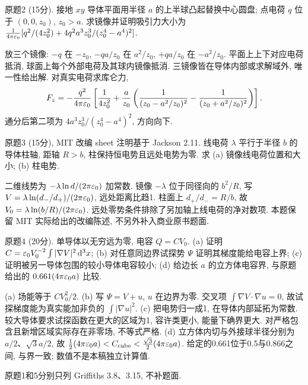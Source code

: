 \begin{exercise}
原题2 (15分). 接地 $xy$ 导体平面用半径 $a$ 的上半球凸起替换中心圆盘; 点电荷 $q$ 位于 $(0,0,z_0)$, $z_0>a$. 求镜像并证明吸引力大小为
$\frac1{4\pi\varepsilon_0}[q^2/(4z_0^2)+4q^2a^3z_0^3/(z_0^4-a^4)^2]$.
\end{exercise}
\begin{solution}
放三个镜像: $-q$ 在 $-z_0$, $-qa/z_0$ 在 $a^2/z_0$, $+qa/z_0$ 在 $-a^2/z_0$. 平面上上下对应电荷抵消, 球面上每个外部电荷及其球内镜像抵消. 三镜像皆在导体内部或求解域外, 唯一性给出解. 对真实电荷求库仑力,
\[
F_z=-\frac{q^2}{4\pi\varepsilon_0}\left[\frac1{4z_0^2}
+\frac a{z_0}\left(\frac1{(z_0-a^2/z_0)^2}-\frac1{(z_0+a^2/z_0)^2}\right)\right].
\]
通分后第二项为 $4a^3z_0^3/(z_0^4-a^4)^2$, 方向向下.
\end{solution}
\begin{exercise}
原题3 (15分), MIT 改编 sheet 注明基于 Jackson 2.11. 线电荷 $\lambda$ 平行于半径 $b$ 的导体柱轴, 距轴 $R>b$, 柱保持恒电势且远处电势为零. 求 (a) 镜像线电荷位置和大小; (b) 柱电势.
\end{exercise}
\begin{solution}
二维线势为 $-\lambda\ln d/(2\pi\varepsilon_0)$ 加常数. 镜像 $-\lambda$ 位于同径向的 $b^2/R$, 写 $V=\lambda\ln(d_-/d_+)/(2\pi\varepsilon_0)$, 远处距离比趋1. 柱面上 $d_+/d_-=R/b$, 故 $V_0=\lambda\ln(b/R)/(2\pi\varepsilon_0)$. 远处零势条件排除了另加轴上线电荷的净对数项. 本题保留 MIT 实际给出的改编陈述, 不另外补入商业原书题面.
\end{solution}
\begin{exercise}
原题4 (20分). 单导体以无穷远为零, 电容 $Q=CV_0$. (a) 证明 $C=\varepsilon_0 V_0^{-2}\int|\nabla V|^2\,\mathrm d^3x$; (b) 对任意同边界试探势 $\Psi$ 证明其梯度能给电容上界; (c) 证明被另一导体包围的较小导体电容较小; (d) 给边长 $a$ 的立方体电容界, 与原题给出的 $0.661(4\pi\varepsilon_0 a)$ 比较.
\end{exercise}
\begin{solution}
(a) 场能等于 $CV_0^2/2$. (b) 写 $\Psi=V+u$, $u$ 在边界为零. 交叉项 $\int\nabla V\cdot\nabla u=0$, 故试探梯度能为真实能加非负的 $\int|\nabla u|^2$. (c) 把电势归一成1, 在导体内部延拓为常数. 较大导体要求试探函数在更大的区域为1, 容许类更小, 能量下确界更大. 对严格包含且新增区域实际存在非零场, 不等式严格. (d) 立方体内切与外接球半径分别为 $a/2$、$\sqrt3a/2$, 故
$\frac12(4\pi\varepsilon_0 a)<C_\mathrm{cube}<\frac{\sqrt3}2(4\pi\varepsilon_0 a)$. 给定的0.661位于0.5与0.866之间, 与界一致; 数值不是本稿独立计算值.
\end{solution}
原题1和5分别只列 Griffiths 3.8、3.15, 不补题面.

